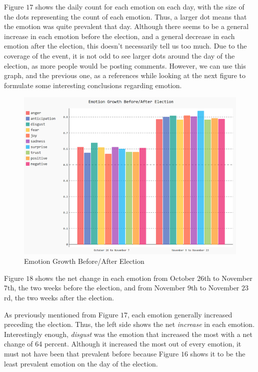 \documentclass[letterpaper]{article}
\begin{document}
Figure $17$ shows the daily count for each emotion on each day, with the size of the dots representing the count of each emotion. Thus, a larger dot means that the emotion was quite prevalent that day. Although there seems to be a general increase in each emotion before the election, and a general decrease in each emotion after the election, this doesn't necessarily tell us too much. Due to the coverage of the event, it is not odd to see larger dots around the day of the election, as more people would be posting comments. However, we can use this graph, and the previous one, as a references while looking at the next figure to formulate some interesting conclusions regarding emotion.

\begin{figure}[!htb]
\begin{center}
\includegraphics[scale=0.3]{Images/emotion-growth-ba.PNG}
\caption{Emotion Growth Before/After Election}
\label{fig1}
\end{center}
\end{figure}

Figure $18$ shows the net change in each emotion from October $26$th to November $7$th, the two weeks before the election, and from November $9$th to November $23$rd, the two weeks after the election.

As previously mentioned from Figure $17$, each emotion generally increased preceding the election. Thus, the left side shows the net \textit{increase} in each emotion. Interestingly enough, \textit{disgust} was the emotion that increased the most with a net change of 64 percent. Although it increased the most out of every emotion, it must not have been that prevalent before because Figure $16$ shows it to be the least prevalent emotion on the day of the election.
\end{document}
